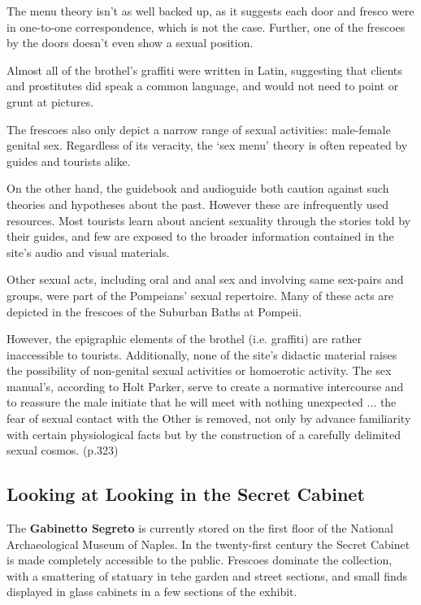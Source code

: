 The menu theory isn't as well backed up, as it suggests each door and fresco were in one-to-one correspondence, which is not the case. Further, one of the frescoes by the doors doesn't even show a sexual position.

\begin{nte}
    Almost all of the brothel's graffiti were written in Latin, suggesting that clients and prostitutes did speak a common language, and would not need to point or grunt at pictures.
\end{nte}

The frescoes also only depict a narrow range of sexual activities: male-female genital sex. Regardless of its veracity, the `sex menu' theory is often repeated by guides and tourists alike.

On the other hand, the guidebook and audioguide both caution against such theories and hypotheses about the past. However these are infrequently used resources. Most tourists learn about ancient sexuality through the stories told by their guides, and few are exposed to the broader information contained in the site's audio and visual materials.

\begin{rmk}
    Other sexual acts, including oral and anal sex and involving same sex-pairs and groups, were part of the Pompeians' sexual repertoire. Many of these acts are depicted in the frescoes of the Suburban Baths at Pompeii.
\end{rmk}

However, the epigraphic elements of the brothel (i.e. graffiti) are rather inaccessible to tourists. Additionally, none of the site's didactic material raises the possibility of non-genital sexual activities or homoerotic activity. The sex manual's, according to Holt Parker, serve to create a normative intercourse and to reassure the male initiate that he will meet with nothing unexpected ... the fear of sexual contact with the Other is removed, not only by advance familiarity with certain physiological facts but by the construction of a carefully delimited sexual cosmos. (p.323)


\subsection{Looking at Looking in the Secret Cabinet}

The \textbf{Gabinetto Segreto} is currently stored on the first floor of the National Archaeological Museum of Naples. In the twenty-first century the Secret Cabinet is made completely accessible to the public. Frescoes dominate the collection, with a smattering of statuary in tehe garden and street sections, and small finds displayed in glass cabinets in a few sections of the exhibit.

